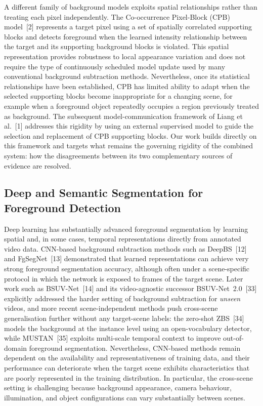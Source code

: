 \documentclass[sn-basic]{sn-jnl}
\begin{document}
A different family of background models exploits spatial relationships rather than
treating each pixel independently. The Co-occurrence Pixel-Block (CPB) model~[2]
represents a target pixel using a set of spatially correlated supporting blocks and
detects foreground when the learned intensity relationship between the target and
its supporting background blocks is violated. This spatial representation provides
robustness to local appearance variation and does not require the type of
continuously scheduled model update used by many conventional background
subtraction methods. Nevertheless, once its statistical relationships have been
established, CPB has limited ability to adapt when the selected supporting blocks
become inappropriate for a changing scene, for example when a foreground object
repeatedly occupies a region previously treated as background. The subsequent
model-communication framework of Liang et al.~[1] addresses this rigidity by using
an external supervised model to guide the selection and replacement of CPB
supporting blocks. Our work builds directly on this framework and targets what
remains the governing rigidity of the combined system: how the disagreements
between its two complementary sources of evidence are resolved.

\subsection{Deep and Semantic Segmentation for Foreground Detection}
Deep learning has substantially advanced foreground segmentation by learning
spatial and, in some cases, temporal representations directly from annotated video
data. CNN-based background subtraction methods such as DeepBS~[12] and FgSegNet~[13]
demonstrated that learned representations can achieve very strong foreground
segmentation accuracy, although often under a scene-specific protocol in which the
network is exposed to frames of the target scene. Later work such as BSUV-Net~[14]
and its video-agnostic successor BSUV-Net~2.0~[33] explicitly addressed the harder
setting of background subtraction for \emph{unseen} videos, and more recent
scene-independent methods push cross-scene generalisation further without any
target-scene labels: the zero-shot ZBS~[34] models the background at the instance
level using an open-vocabulary detector, while MUSTAN~[35] exploits multi-scale
temporal context to improve out-of-domain foreground segmentation. Nevertheless,
CNN-based methods remain dependent on the availability and
representativeness of training data, and their performance can deteriorate when the
target scene exhibits characteristics that are poorly represented in the training
distribution. In particular, the cross-scene setting is challenging because
background appearance, camera behaviour, illumination, and object configurations can
vary substantially between scenes.
\end{document}
